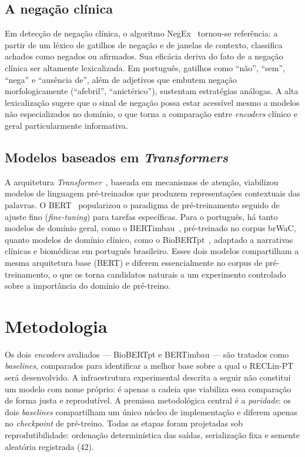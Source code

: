 \documentclass[12pt]{article}
\begin{document}
\subsection{A negação clínica}
Em detecção de negação clínica, o algoritmo NegEx~\cite{chapman:01} tornou-se
referência: a partir de um léxico de gatilhos de negação e de janelas de
contexto, classifica achados como negados ou afirmados. Sua eficácia deriva do
fato de a negação clínica ser altamente lexicalizada. Em português, gatilhos
como ``não'', ``sem'', ``nega'' e ``ausência de'', além de adjetivos que embutem
negação morfologicamente (``afebril'', ``anictérico''), sustentam estratégias
análogas. A alta lexicalização sugere que o sinal de negação possa estar
acessível mesmo a modelos não especializados no domínio, o que torna a
comparação entre \emph{encoders} clínico e geral particularmente informativa.

\subsection{Modelos baseados em \emph{Transformers}}
A arquitetura \emph{Transformer}~\cite{vaswani:17}, baseada em mecanismos de
atenção, viabilizou modelos de linguagem pré-treinados que produzem
representações contextuais das palavras. O BERT~\cite{devlin:19} popularizou o
paradigma de pré-treinamento seguido de ajuste fino (\emph{fine-tuning}) para
tarefas específicas. Para o português, há tanto modelos de domínio geral, como o
BERTimbau~\cite{souza:20}, pré-treinado no corpus brWaC, quanto modelos de
domínio clínico, como o BioBERTpt~\cite{schneider:20}, adaptado a narrativas
clínicas e biomédicas em português brasileiro. Esses dois modelos compartilham a
mesma arquitetura base (BERT) e diferem essencialmente no corpus de
pré-treinamento, o que os torna candidatos naturais a um experimento controlado
sobre a importância do domínio de pré-treino.

\section{Metodologia}\label{sec:met}

Os dois \emph{encoders} avaliados --- BioBERTpt e BERTimbau --- são tratados como
\emph{baselines}, comparados para identificar a melhor base sobre a qual o
RECLin-PT será desenvolvido. A infraestrutura experimental descrita a seguir não
constitui um modelo com nome próprio: é apenas a cadeia que viabiliza essa
comparação de forma justa e reprodutível. A premissa metodológica central é a
\emph{paridade}: os dois \emph{baselines} compartilham um único núcleo de
implementação e diferem apenas no \emph{checkpoint} de pré-treino. Todas as
etapas foram projetadas sob reprodutibilidade: ordenação determinística das
saídas, serialização fixa e semente aleatória registrada (42).
\end{document}
